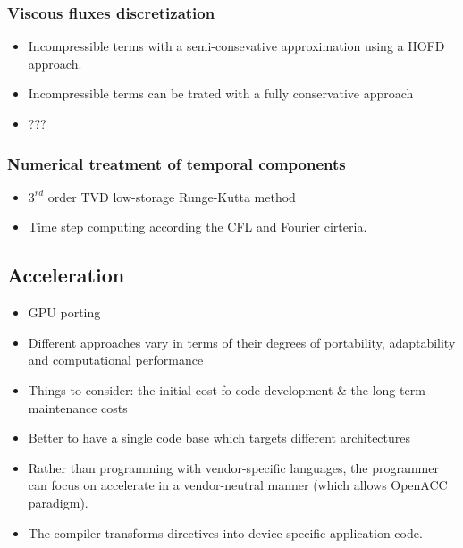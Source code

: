 \documentclass[10pt,a4paper]{article}
\begin{document}
\subsubsection{Viscous fluxes discretization}
\begin{itemize}
\item Incompressible terms with a semi-consevative approximation using a HOFD approach.
\item Incompressible terms can be trated with a fully conservative approach
\item ???
\end{itemize}
\subsubsection{Numerical treatment of temporal components}
\begin{itemize}
\item $3^{rd}$ order TVD low-storage Runge-Kutta method
\item Time step computing according the CFL and Fourier cirteria.
\end{itemize}

\subsection{Acceleration}
\begin{itemize}
\item GPU porting
\item Different approaches vary in terms of their degrees of portability, adaptability and computational performance
\item Things to consider: the initial cost fo code development \& the long term maintenance costs
\item Better to have a single code base which targets different architectures
\item Rather than programming with vendor-specific languages, the programmer can focus on accelerate in a vendor-neutral manner (which allows OpenACC paradigm).
\item The compiler transforms directives into device-specific application code.
\end{itemize}
\end{document}
